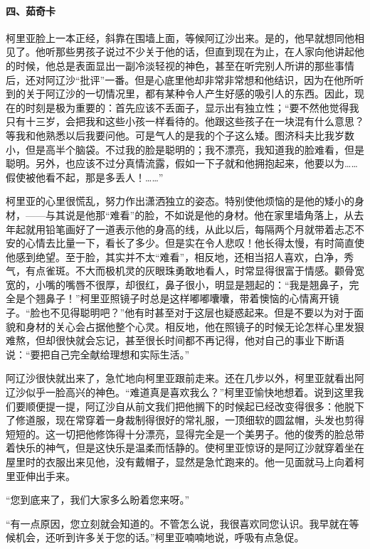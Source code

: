 \paragraph*{四、茹奇卡}
\par 柯里亚脸上一本正经，斜靠在围墙上面，等候阿辽沙出来。是的，他早就想同他相见了。他听那些男孩子说过不少关于他的话，但直到现在为止，在人家向他讲起他的时候，他总是表面显出一副冷淡轻视的神色，甚至在听完别人所讲的那些事情后，还对阿辽沙“批评”一番。但是心底里他却非常非常想和他结识，因为在他所听到的关于阿辽沙的一切情况里，都有某种令人产生好感的吸引人的东西。因此，现在的时刻是极为重要的：首先应该不丢面子，显示出有独立性；“要不然他觉得我只有十三岁，会把我和这些小孩一样看待的。他跟这些孩子在一块混有什么意思？等我和他熟悉以后我要问他。可是气人的是我的个子这么矮。图济科夫比我岁数小，但是高半个脑袋。不过我的脸是聪明的；我不漂亮，我知道我的脸难看，但是聪明。另外，也应该不过分真情流露，假如一下子就和他拥抱起来，他要以为……假使被他看不起，那是多丢人！……”
\par 柯里亚的心里很慌乱，努力作出潇洒独立的姿态。特别使他烦恼的是他的矮小的身材，——与其说是他那“难看”的脸，不如说是他的身材。他在家里墙角落上，从去年起就用铅笔画好了一道表示他的身高的线，从此以后，每隔两个月就带着忐忑不安的心情去比量一下，看长了多少。但是实在令人悲叹！他长得太慢，有时简直使他感到绝望。至于脸，其实并不太“难看”，相反地，还相当招人喜欢，白净，秀气，有点雀斑。不大而极机灵的灰眼珠勇敢地看人，时常显得很富于情感。颧骨宽宽的，小嘴的嘴唇不很厚，却很红，鼻子很小，明显是翘起的：“我是翘鼻子，完全是个翘鼻子！”柯里亚照镜子时总是这样嘟嘟囔囔，带着懊恼的心情离开镜子。“脸也不见得聪明吧？”他有时甚至对于这层也疑惑起来。但是不要以为对于面貌和身材的关心会占据他整个心灵。相反地，他在照镜子的时候无论怎样心里发狠难熬，但却很快就会忘记，甚至很长时间都不再记得，他对自己的事业下断语说：“要把自己完全献给理想和实际生活。”
\par 阿辽沙很快就出来了，急忙地向柯里亚跟前走来。还在几步以外，柯里亚就看出阿辽沙似乎一脸高兴的神色。“难道真是喜欢我么？”柯里亚愉快地想着。说到这里我们要顺便提一提，阿辽沙自从前文我们把他搁下的时候起已经改变得很多：他脱下了修道服，现在常穿着一身裁制得很好的常礼服，一顶细软的圆盆帽，头发也剪得短短的。这一切把他修饰得十分漂亮，显得完全是一个美男子。他的俊秀的脸总带着快乐的神气，但是这快乐是温柔而恬静的。使柯里亚惊讶的是阿辽沙就穿着坐在屋里时的衣服出来见他，没有戴帽子，显然是急忙跑来的。他一见面就马上向着柯里亚伸出手来。
\par “您到底来了，我们大家多么盼着您来呀。”
\par “有一点原因，您立刻就会知道的。不管怎么说，我很喜欢同您认识。我早就在等候机会，还听到许多关于您的话。”柯里亚喃喃地说，呼吸有点急促。
